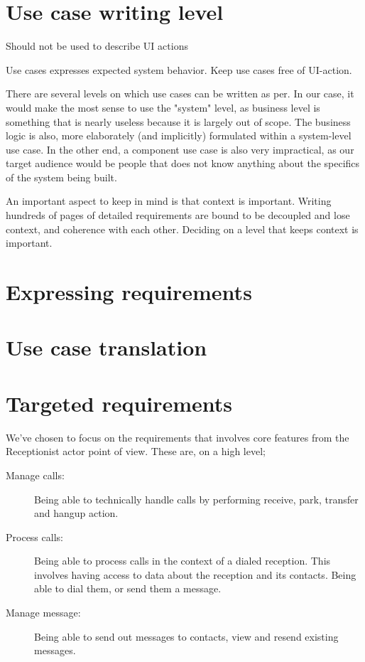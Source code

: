 \section{Use case writing level}
Should not be used to describe UI actions%

Use cases expresses expected system behavior. Keep use cases free of UI-action.

There are several levels on which use cases can be written as per\cite{cockburn??}. In our case, it would make the most sense to use the "system" level, as business level is something that is nearly useless because it is largely out of scope. The business logic is also, more elaborately (and implicitly) formulated within a system-level use case. In the other end, a component use case is also very impractical, as our target audience would be people that does not know anything about the specifics of the system being built.

An important aspect to keep in mind is that context is important. Writing hundreds of pages of detailed requirements are bound to be decoupled and lose context, and coherence with each other. Deciding on a level that keeps context is important.

\section{Expressing requirements}

\section{Use case translation}


\section{Targeted requirements}
We've chosen to focus on the requirements that involves core features from the Receptionist actor point of view. These are, on a high level;
\begin{description}
  \item[Manage calls:] Being able to technically handle calls by performing receive, park, transfer and hangup action.
  \item[Process calls:] Being able to process calls in the context of a dialed reception. This involves having access to data about the reception and its contacts. Being able to dial them, or send them a message.
  \item[Manage message:] Being able to send out messages to contacts, view and resend existing messages.
\end{description}

